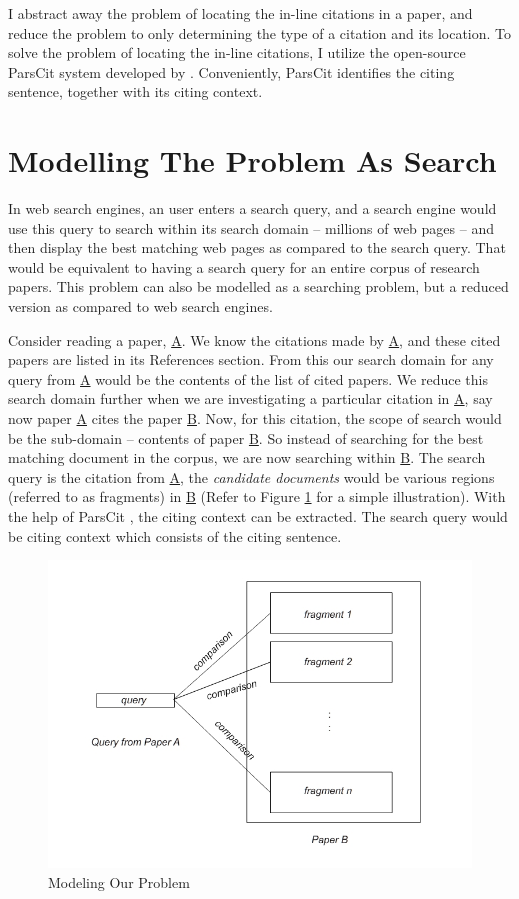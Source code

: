 I abstract away the problem of locating the in-line citations in a paper, and reduce the problem to only determining the type of a citation and its location. To solve the problem of locating the in-line citations, I utilize the open-source ParsCit system developed by \cite{parscit}. Conveniently, ParsCit identifies the citing sentence, together with its citing context.

\section{Modelling The Problem As Search}
In web search engines, an user enters a search query, and a search engine would use this query to search within its search domain -- millions of web pages -- and then display the best matching web pages as compared to the search query. That would be equivalent to having a search query for an entire corpus of research papers. This problem can also be modelled as a searching problem, but a reduced version as compared to web search engines.

Consider reading a paper, \url{A}. We know the citations made by \url{A}, and these cited papers are listed in its References section. From this our search domain for any query from \url{A} would be the contents of the list of cited papers. We reduce this search domain further when we are investigating a particular citation in \url{A}, say now paper \url{A} cites the paper \url{B}. Now, for this citation, the scope of search would be the sub-domain -- contents of paper \url{B}. So instead of searching for the best matching document in the corpus, we are now searching within \url{B}. The search query is the citation from \url{A}, the {\it candidate documents} would be various regions (referred to as fragments) in \url{B} (Refer to Figure \ref{fig:model} for a simple illustration). With the help of ParsCit \cite{parscit}, the citing context can be extracted. The search query would be citing context which consists of the citing sentence.

\begin{figure}[h]
  \centering
  \includegraphics[scale=0.50]{./model}
  \caption{Modeling Our Problem}
  \label{fig:model}
\end{figure}

